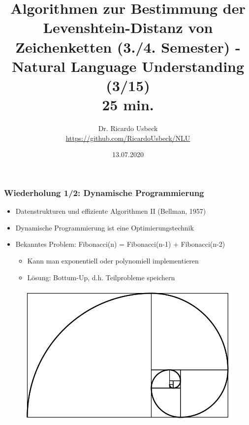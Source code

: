 \documentclass[aspectratio=169]{beamer}
\begin{document}
\title[Levenshtein-Distanz]{Algorithmen zur Bestimmung der Levenshtein-Distanz von Zeichenketten (3./4. Semester) - \\ Natural Language Understanding (3/15)\\ 25 min.}   
\author[Dr. R. Usbeck]{Dr. Ricardo Usbeck\\\url{https://github.com/RicardoUsbeck/NLU}} 
\date{13.07.2020}

\begin{frame}
\titlepage
\end{frame}

\begin{frame}[fragile]\frametitle{Wiederholung 1/2: Dynamische Programmierung }
\begin{itemize}
    \item Datenstrukturen und effiziente Algorithmen II  (Bellman, 1957)
    \item Dynamische Programmierung ist eine Optimierungstechnik 
    \pause
    \item Bekanntes Problem: Fibonacci(n) = Fibonacci(n-1) + Fibonacci(n-2) %
    \begin{itemize}
        \item Kann man exponentiell oder polynomiell implementieren %
        \item Lösung: Bottum-Up, d.h. Teilprobleme speichern
    \end{itemize}
\end{itemize}
\begin{figure}
    \centering
    \includegraphics[width=0.4\linewidth]{800px-Fibonacci_spiral_34.svg.png}
\end{figure}
\end{frame}
 
\end{document}
